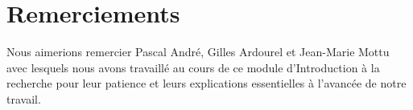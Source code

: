 \vspace*{\fill}
\section*{Remerciements}
\label{sec:Remerciments}


Nous aimerions remercier Pascal André, Gilles Ardourel et Jean-Marie Mottu avec lesquels nous avons travaillé au cours de ce module d'Introduction à la recherche pour leur patience et leurs explications essentielles à l'avancée de notre travail.


\vspace*{\fill}